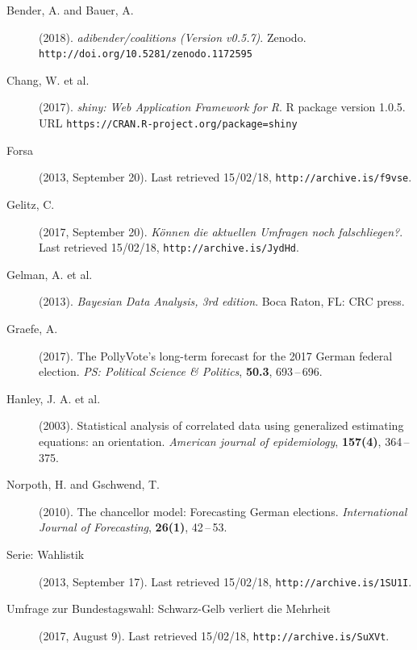 \documentclass[twoside]{report}
\begin{document}




\begin{description}
\item[Bender, A. and Bauer, A.] (2018).
     {\it adibender/coalitions (Version v0.5.7)}.
     Zenodo. \texttt{http://doi.org/10.5281/zenodo.1172595}
\item[Chang, W. et al.] (2017).
     {\it shiny: Web Application Framework for R}.
     R package version 1.0.5.
     URL \texttt{https://CRAN.R-project.org/package=shiny}
\item[Forsa] (2013, September 20).
     Last retrieved 15/02/18, \texttt{http://archive.is/\allowbreak f9vse}.
\item[Gelitz, C.] (2017, September 20).
     {\it K\"{o}nnen die aktuellen Umfragen noch falsch\-liegen?}.
     Last retrieved 15/02/18, \texttt{http://archive.is/JydHd}.
\item[Gelman, A. et al.] (2013).
     {\it Bayesian Data Analysis, 3rd edition}.
     Boca Raton, FL: CRC press.
\item[Graefe, A.] (2017).
     The PollyVote's long-term forecast for the 2017 German federal election.
     {\it PS: Political Science \& Politics}, {\bf 50.3},
     693\,--\,696.
\item[Hanley, J. A. et al.] (2003).
     Statistical analysis of correlated data using generalized estimating equations: an orientation.
     {\it American journal of epidemiology}, {\bf 157(4)},
     364\,--\,375.
\item[Norpoth, H. and Gschwend, T.] (2010).
     The chancellor model: Forecasting German elections.
     {\it International Journal of Forecasting}, {\bf 26(1)},
     42\,--\,53.
\item[Serie: Wahlistik] (2013, September 17).
     Last retrieved 15/02/18, \texttt{http://\allowbreak archive.is/1SU1I}.
\item[Umfrage zur Bundestagswahl: Schwarz-Gelb verliert die Mehrheit] (2017, August 9).
     Last retrieved 15/02/18, \texttt{http://archive.is/SuXVt}.
\end{description}
\end{document}
